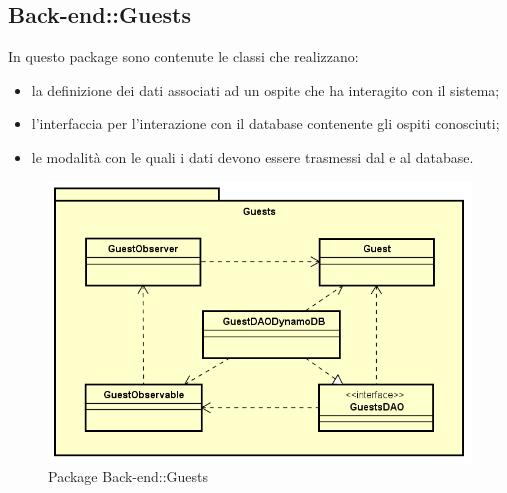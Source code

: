 \subsection{Back-end::Guests}
In questo package sono contenute le classi che realizzano: \begin{itemize} \item la definizione dei dati associati ad un ospite che ha interagito con il sistema; \item l'interfaccia per l'interazione con il database contenente gli ospiti conosciuti; \item le modalità con le quali i dati devono essere trasmessi dal e al database. \end{itemize}
\begin{figure}[h] \centering \includegraphics[width=\textwidth,height=\textheight,keepaspectratio]{images/diagrams/back-end/Official_Backend_0304/Guest.png}
	\caption{Package Back-end::Guests}
\end{figure}
\newpage

